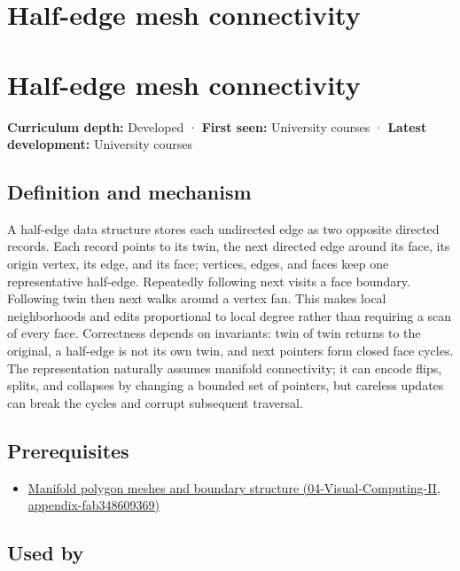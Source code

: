 \hypertarget{appendix-1aea26b2307f}{}
\section*{Half-edge mesh connectivity}
\section{Half-edge mesh connectivity}\label{appendix-1aea26b2307f-half-edge-mesh-connectivity}

\textbf{Curriculum depth:} Developed · \textbf{First seen:} University courses · \textbf{Latest development:} University courses

\subsection{Definition and mechanism}\label{appendix-1aea26b2307f-definition-and-mechanism}

A half-edge data structure stores each undirected edge as two opposite directed records. Each record points to its twin, the next directed edge around its face, its origin vertex, its edge, and its face; vertices, edges, and faces keep one representative half-edge. Repeatedly following next visits a face boundary. Following twin then next walks around a vertex fan. This makes local neighborhoods and edits proportional to local degree rather than requiring a scan of every face. Correctness depends on invariants: twin of twin returns to the original, a half-edge is not its own twin, and next pointers form closed face cycles. The representation naturally assumes manifold connectivity; it can encode flips, splits, and collapses by changing a bounded set of pointers, but careless updates can break the cycles and corrupt subsequent traversal.

\subsection{Prerequisites}\label{appendix-1aea26b2307f-prerequisites}

\begin{itemize}
\tightlist
\item
  \href{../04-Visual-Computing-II/main.pdf\#nameddest=appendix-fab348609369}{Manifold polygon meshes and boundary structure (04-Visual-Computing-II, appendix-fab348609369)}
\end{itemize}

\subsection{Used by}\label{appendix-1aea26b2307f-used-by}

